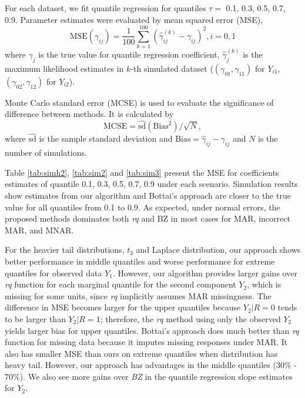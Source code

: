 \documentclass[useAMS,usenatbib,referee]{biom}
\begin{document}
For each dataset, we fit quantile regression for quantiles $\tau =$
0.1, 0.3, 0.5, 0.7, 0.9.  Parameter estimates were evaluated by mean
squared error (MSE),
\begin{displaymath}
  \mbox{MSE} (\gamma_{ij}) = \frac{1}{100} \sum_{k = 1}^{100}
  \left( \hat{\gamma}_{ij}^{(k)}  - \gamma_{ij}\right)^2, i = 0, 1
\end{displaymath}
where $\gamma_{j}$ is the true value for quantile regression
coefficient, $\hat{\gamma}_{j}^{(k)}$ is the maximum likelihood
estimates in $k$-th simulated dataset ($(\gamma_{01}, \gamma_{11})$
for $Y_{i1}$, $(\gamma_{02}, \gamma_{12})$ for $Y_{i2}$).

Monte Carlo standard error (MCSE) is used to evaluate the significance
of difference between methods. It is calculated by
\begin{displaymath}
  \mbox{MCSE} = \hat{\mbox{sd}}(\mbox{Bias}^2)/\sqrt{N},
\end{displaymath}
where $\hat{\mbox{sd}}$ is the sample standard deviation and
$\mbox{Bias} = \hat{\gamma}_{ij} - \gamma_{ij}$ and $N$ is the number
of simulations.

Table \ref{tab:simh2}, \ref{tab:sim2} and \ref{tab:sim3} present the
MSE for coefficients estimates of quantile 0.1, 0.3, 0.5, 0.7, 0.9
under each scenario.  Simulation results show estimates from our
algorithm and Bottai's approach are closer to the true value for all
quantiles from 0.1 to 0.9.  As expected, under normal errors, the
proposed methods dominates both \textit{rq} and BZ in most cases for
MAR, incorrect MAR, and MNAR.

For the heavier tail distributions, $t_3$ and Laplace distribution,
our approach shows better performance in middle quantiles and worse
performance for extreme quantiles for observed data $Y_1$. However,
our algorithm provides larger gains over \textit{rq} function for each
marginal quantile for the second component $Y_2$, which is missing for
some units, since \textit{rq} implicitly assumes MAR missingness.  The
difference in MSE becomes larger for the upper quantiles because $Y_2
|R = 0$ tends to be larger than $Y_2 | R = 1$; therefore, the
\textit{rq} method using only the observed $Y_2$ yields larger bias
for upper quantiles. Bottai's approach does much better than
\textit{rq} function for missing data because it imputes missing
responses under MAR.  It also has smaller MSE than ours on extreme
quantiles when distribution has heavy tail. However, our approach has
advantages in the middle quantiles (30\% - 70\%).  We also see more
gains over \textit{BZ} in the quantile regression slope estimates for
$Y_2$.
\end{document}

